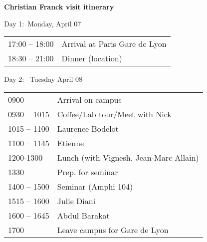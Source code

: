 \documentclass[a4paper,11pt,fleqn]{article}
\begin{document}
	\sffamily
	\thispagestyle{titlepage}
	\vspace*{-2em}
	\begin{center}
		\huge \textbf{Christian Franck visit itinerary}
	\end{center}
	\begin{center}
		\Large 
		Day 1:~Monday, April 07\\
		\begin{tabular}{| p{4cm} p{13cm} |}
			\hline
			17:00 -- 18:00 & Arrival at Paris Gare de Lyon\\
			18:30 -- 21:00 & Dinner (location) \\
			\hline
		\end{tabular}
		\vspace*{1em}
		
		Day 2:~ Tuesday April 08\\
		\begin{tabular}{| p{4cm} p{13cm} |}
			\hline
			0900 & Arrival on campus \\
			0930 -- 1015 & Coffee/Lab tour/Meet with Nick \\
			1015 -- 1100 & Laurence Bodelot \\
			1100 -- 1145 & Etienne \\
			1200-1300 & Lunch (with Vignesh, Jean-Marc Allain)\\
			1330 & Prep. for seminar \\
			1400 -- 1500 & Seminar (Amphi 104) \\ 
			1515 -- 1600 & Julie Diani \\
			1600 -- 1645 & Abdul Barakat \\
			1700 & Leave campus for Gare de Lyon \\
			\hline
		\end{tabular}
		\vspace*{1em}
	\end{center}
		
\end{document}
